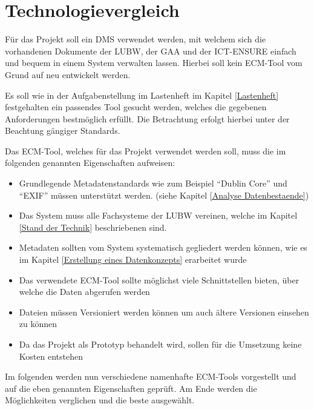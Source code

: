 \section{Technologievergleich}\label{Technologievergleich}
F\"ur das Projekt soll ein \ac{DMS} verwendet werden, mit welchem sich die vorhandenen Dokumente der \ac{LUBW}, der \ac{GAA} und der \ac{ICT-ENSURE} einfach und bequem in einem System verwalten lassen. Hierbei soll kein \ac{ECM}-Tool vom Grund auf neu entwickelt werden. 

Es soll wie in der Aufgabenstellung im Lastenheft im Kapitel \ref{Lastenheft} festgehalten ein passendes Tool gesucht werden, welches die gegebenen Anforderungen bestm\"oglich erf\"ullt. Die Betrachtung erfolgt hierbei unter der Beachtung g\"angiger Standards.

Das \ac{ECM}-Tool, welches f\"ur das Projekt verwendet werden soll, muss die im folgenden genannten Eigenschaften aufweisen:

\begin{itemize}
 \item Grundlegende Metadatenstandards wie zum Beispiel "`Dublin Core"' und "`EXIF"' m\"ussen unterst\"utzt werden. (siehe Kapitel \ref{Analyse Datenbestaende})
 \item Das System muss alle Fachsysteme der \ac{LUBW} vereinen, welche im Kapitel \ref{Stand der Technik} beschriebenen sind.
 \item Metadaten sollten vom System systematisch gegliedert werden k\"onnen, wie es im Kapitel \ref{Erstellung eines Datenkonzepts} erarbeitet wurde
 \item Das verwendete \ac{ECM}-Tool sollte m\"oglichst viele Schnittstellen bieten, \"uber welche die Daten abgerufen werden
 \item Dateien m\"ussen Versioniert werden k\"onnen um auch \"altere Versionen einsehen zu k\"onnen
 \item Da das Projekt als Prototyp behandelt wird, sollen f\"ur die Umsetzung keine Kosten entstehen
\end{itemize}

Im folgenden werden nun verschiedene namenhafte \ac{ECM}-Tools vorgestellt und auf die eben genannten Eigenschaften gepr\"uft. Am Ende werden die M\"oglichkeiten verglichen und die beste ausgew\"ahlt.



